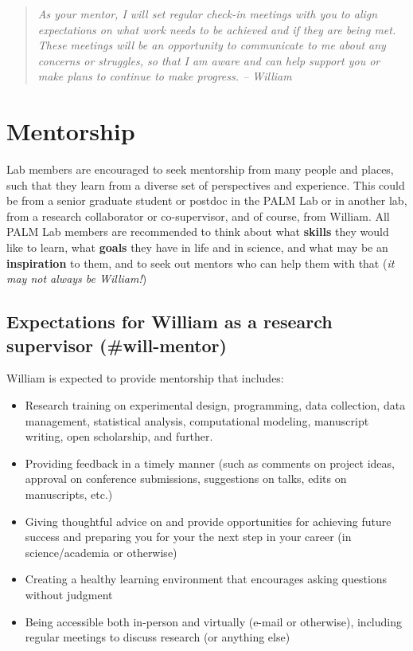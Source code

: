 \documentclass[
]{book}
\providecommand{\tightlist}{%
  \setlength{\itemsep}{0pt}\setlength{\parskip}{0pt}}
\begin{document}
\begin{quote}
\emph{As your mentor, I will set regular check-in meetings with you to align expectations on what work needs to be achieved and if they are being met. These meetings will be an opportunity to communicate to me about any concerns or struggles, so that I am aware and can help support you or make plans to continue to make progress. -- William}
\end{quote}

\hypertarget{lab-mentorship}{%
\section{Mentorship}\label{lab-mentorship}}

Lab members are encouraged to seek mentorship from many people and places, such that they learn from a diverse set of perspectives and experience. This could be from a senior graduate student or postdoc in the PALM Lab or in another lab, from a research collaborator or co-supervisor, and of course, from William. All PALM Lab members are recommended to think about what \textbf{skills} they would like to learn, what \textbf{goals} they have in life and in science, and what may be an \textbf{inspiration} to them, and to seek out mentors who can help them with that (\emph{it may not always be William!})

\hypertarget{expectations-for-william-as-a-research-supervisor-will-mentor}{%
\subsection{Expectations for William as a research supervisor (\#will-mentor)}\label{expectations-for-william-as-a-research-supervisor-will-mentor}}

William is expected to provide mentorship that includes:

\begin{itemize}
\tightlist
\item
  Research training on experimental design, programming, data collection, data management, statistical analysis, computational modeling, manuscript writing, open scholarship, and further.
\item
  Providing feedback in a timely manner (such as comments on project ideas, approval on conference submissions, suggestions on talks, edits on manuscripts, etc.)
\item
  Giving thoughtful advice on and provide opportunities for achieving future success and preparing you for your the next step in your career (in science/academia or otherwise)
\item
  Creating a healthy learning environment that encourages asking questions without judgment
\item
  Being accessible both in-person and virtually (e-mail or otherwise), including regular meetings to discuss research (or anything else)
\end{itemize}
\end{document}
